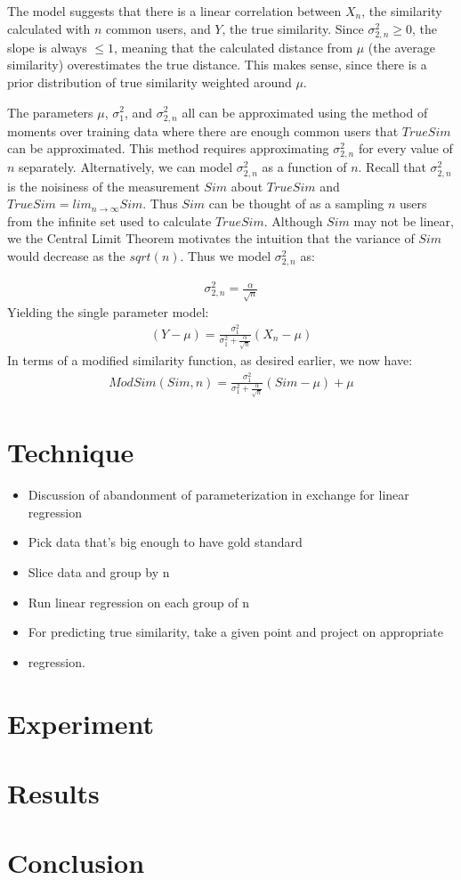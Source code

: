 \documentclass[10pt]{article}
\begin{document}
The model suggests that there is a linear correlation between $X_n$, the
similarity calculated with $n$ common users, and $Y$, the true similarity. Since 
$\sigma_{2,n}^2\ge0$, the slope is always $\le1$, meaning that the calculated
distance from $\mu$ (the average similarity) overestimates the true distance. This makes
sense, since there is a prior distribution of true similarity weighted around $\mu$.

The parameters $\mu$, $\sigma_{1}^2$, and $\sigma_{2,n}^2$ all can be approximated 
using the method of moments over training data where there are enough common
users that $TrueSim$ can be approximated. This method requires approximating
$\sigma_{2,n}^2$ for every value of $n$ separately. Alternatively, we can model
$\sigma_{2,n}^2$ as a function of $n$. Recall that $\sigma_{2,n}^2$ is the
noisiness of the measurement $Sim$ about $TrueSim$ and $TrueSim = lim_{n \to
\infty}Sim$. Thus $Sim$ can be thought of as a sampling $n$ users from the
infinite set used to calculate $TrueSim$. Although $Sim$ may not be linear, we
the Central Limit Theorem motivates the intuition that the variance of $Sim$
would decrease as the $sqrt(n)$. Thus we model $\sigma_{2,n}^2$ as:

\begin{align}
\sigma_{2,n}^2 = \frac{\alpha}{\sqrt{n}}
\end{align}
Yielding the single parameter model:
\begin{align}
\left(Y - \mu\right) = \frac{\sigma_{1}^2}{\sigma_{1}^2+\frac{\alpha}{\sqrt{n}}}
\left(X_n-\mu\right)
\end{align}
In terms of a modified similarity function, as desired earlier, we now have:
\begin{align}
ModSim(Sim, n) = \frac{\sigma_{1}^2}{\sigma_{1}^2+\frac{\alpha}{\sqrt{n}}}
\left(Sim-\mu\right) + \mu
\end{align}

\section*{Technique}

\begin{itemize}
    \item Discussion of abandonment of parameterization in exchange for linear regression
    \item Pick data that's big enough to have gold standard
    \item Slice data and group by n
    \item Run linear regression on each group of n
    \item For predicting true similarity, take a given point and project on appropriate
    \item regression.
\end{itemize}


\section*{Experiment}

\section*{Results}

\section*{Conclusion}
\end{document}
